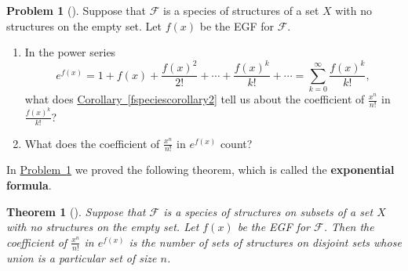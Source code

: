 \documentclass[10pt,]{book}
\newcommand{\terminology}[1]{\textbf{#1}}
\theoremstyle{plain}
\newtheorem{theorem}{Theorem}[section]
\theoremstyle{definition}
\newtheorem{activity}[project]{Problem}
\theoremstyle{definition}
\numberwithin{equation}{chapter}
\newcommand{\F}{\mathcal{F}}
\begin{document}
\begin{activity}[] \label{exponentialformula}
\hypertarget{p-2173}{}%
Suppose that \(\F\) is a species of structures of a set \(X\) with no structures on the empty set.  Let \(f(x)\) be the EGF for \(\F\).%
\begin{enumerate}[font=\bfseries,label=(\alph*),ref=\alph*]
\item\label{task-266} \marginsymbol[-2.5em]{} \hypertarget{p-2174}{}%
In the power series%
\begin{equation*}
e^{f(x)} = 1 + f(x) + \frac{f(x)^2}{2!} +
\cdots + \frac{f(x)^k}{k!} + \cdots= \sum_{k=0}^\infty \frac{f(x)^k}{k!},
\end{equation*}
what does \hyperref[fspeciescorollary2]{Corollary~\ref{fspeciescorollary2}} tell us about the coefficient of \(\frac{x^n}{n!}\) in \(\frac{f(x)^k}{k!}\)?%
\item\label{task-267} \marginsymbol[-2.5em]{} \hypertarget{p-2176}{}%
What does the coefficient of \(\frac{x^n}{n!}\) in \(e^{f(x)}\) count?%
\end{enumerate}
\end{activity}
\hypertarget{p-2178}{}%
In \hyperref[exponentialformula]{Problem~\ref{exponentialformula}} we proved the following theorem, which is called the \terminology{exponential formula}.%
\begin{theorem}[{}]\label{exponentialformulathm}
\hypertarget{p-2179}{}%
Suppose that \(\F\) is a species of structures on subsets of a set \(X\) with no structures on the empty set. Let \(f(x)\) be the EGF for \(\F\). Then the coefficient of \(\frac{x^n}{n!}\) in \(e^{f(x)}\) is the number of sets of structures on disjoint sets whose union is a particular set of size \(n\).%
\end{theorem}
\hypertarget{p-2180}{}%
\end{document}
